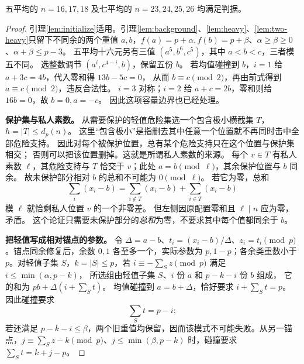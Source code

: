 \begin{lemma}[五平均和七平均的碰撞分类]\label{lem:collision-small}
五平均的 $n=16,17,18$ 及七平均的 $n=23,24,25,26$ 均满足判据。
\end{lemma}
\begin{proof}
引理\ref{lem:initialize}适用。引理\ref{lem:background}、\ref{lem:heavy}、\ref{lem:two-heavy}只留下不同余的两个重值 $a,b$，$f(a)=p+\alpha,f(b)=p+\beta$、$\alpha\ge\beta\ge0$、$\alpha+\beta\le p-3$。
五平均十六元另有三值 $(a^5,b^6,c^5)$，其中 $a<b<c$，三者模五不同。
选整数调节 $(a^i,c^{4-i},b)$，保留五份 $b$。
若均值碰撞到 $b$，$i=1$ 给 $a+3c=4b$，代入零和得 $13b-5c=0$，
从而 $b\equiv c\pmod2$，再由前式得到 $a\equiv c\pmod2$，违反合法性。
$i=3$ 对称；$i=2$ 给 $a+c=2b$，零和则给 $16b=0$，故 $b=0,a=-c$。
因此这项容量边界也已经处理。

\par\noindent\textbf{保护集与私人素数。}
从需要保护的轻值危险集选一个包含极小横截集 $T$，$h=|T|\le d_p(n)$。
这里“包含极小”是指删去其中任意一个位置就不再同时击中全部危险支持。
因此对每个被保护位置，总有某个危险支持只在这个位置与保护集相交；
否则可以把该位置删掉。这就是所谓私人素数的来源。
每个 $v\in T$ 有私人素数 $\ell$，其危险支持与 $T$ 恰交于 $v$；此处 $a=b\pmod\ell$，其余保护位置与 $b$ 同余。
故未保护部分相对 $b$ 的总和不可能为 $0\pmod\ell$。
若它为零，总和
\[
\sum_i(x_i-b)=\sum_{i\notin T}(x_i-b)+\sum_{i\in T}(x_i-b)
\]
模 $\ell$ 就恰剩私人位置 $v$ 的一个非零差。
但左侧因原配置零和且 $\ell\mid n$ 应为零，矛盾。
这个论证只需要未保护部分的\emph{总和}为零，不要求其中每个值都同余于 $b$。

\par\noindent\textbf{把轻值写成相对锚点的参数。}
令 $\Delta=a-b$、$t_i=(x_i-b)/\Delta$、$z_i=t_i\pmod p$。锚点同余修复后，余数 $0,1$ 各至多一个，实际参数为 $p,1-p$；各余类重数小于 $p$。对轻值子集 $S$，$k=|S|\le p$，若 $i\equiv-\sum_{S}z\pmod p$ 满足 $i\le\min(\alpha,p-k)$，
所选组由轻值子集 $S$、$i$ 份 $a$ 和 $p-k-i$ 份 $b$ 组成，
它的和为 $pb+\Delta(i+\sum_S t)$。
均值碰撞到 $a=b+\Delta$，恰好要求 $i+\sum_S t=p$。
因此碰撞要求
\begin{equation}\label{eq:collision}
\sum_{S}t=p-i;
\end{equation}
若还满足 $p-k-i\le\beta$，两个旧重值均保留，因而该模式不可能失败。从另一锚点，$j\equiv\sum_S z-k\pmod p$、$j\le\min(\beta,p-k)$ 时，碰撞要求 $\sum_S t=k+j-p$。


\end{proof}
